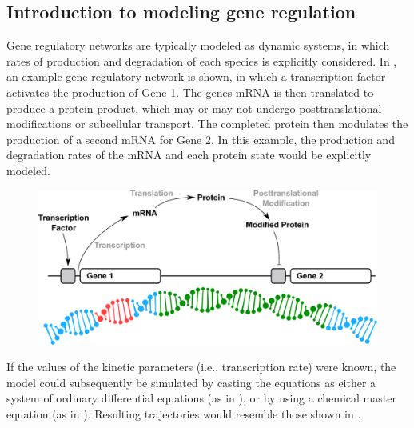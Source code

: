 \subsection{Introduction to modeling gene regulation}

Gene regulatory networks are typically modeled as dynamic systems, in which rates of production and degradation of each species is explicitly considered.
In , an example gene regulatory network is shown, in which a transcription factor activates the production of Gene 1. 
The genes mRNA is then translated to produce a protein product, which may or may not undergo posttranslational modifications or subcellular transport. 
The completed protein then modulates the production of a second mRNA for Gene 2.
In this example, the production and degradation rates of the mRNA and each protein state would be explicitly modeled.

\begin{figure}[tbp]
  \centering
  \includegraphics[width=\textwidth, clip=True, trim=0 100 0 0]{chap1/figures/sysbio_intro.pdf}
  \label{fig:sysbiointro}
\end{figure}

If the values of the kinetic parameters (i.e., transcription rate) were known, the model could subsequently be simulated by casting the equations as either a system of ordinary differential equations (as in ), or by using a chemical master equation (as in ). Resulting trajectories would resemble those shown in .

